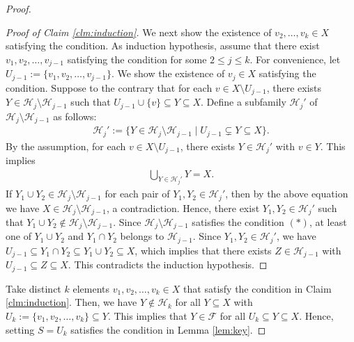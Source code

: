 \documentclass[10pt,a4paper]{amsart}
\begin{document}
\begin{proof}
\begin{proof}[Proof of Claim \ref{clm:induction}]
We next show the existence of $v_2,\ldots,v_k\in X$ satisfying the condition.
As induction hypothesis, assume that there exist $v_1,v_2,\ldots,v_{j-1}$ satisfying the condition for some $2\le j\le k$.
For convenience, let $U_{j-1}:=\{v_1,v_2,\ldots,v_{j-1}\}$.
We show the existence of $v_j\in X$ satisfying the condition.
Suppose to the contrary that for each $v\in X\setminus U_{j-1}$, there exists $Y\in \mathcal{H}_j\setminus \mathcal{H}_{j-1}$ such that $U_{j-1}\cup \{v\}\subseteq Y\subseteq X$.
Define a subfamily $\mathcal{H}_j'$ of $\mathcal{H}_j\setminus \mathcal{H}_{j-1}$ as follows:
\begin{align*}
\mathcal{H}_j':=\{Y\in \mathcal{H}_j\setminus \mathcal{H}_{j-1}\mid U_{j-1}\subsetneq Y\subseteq X\}.
\end{align*}
By the assumption, for each $v\in X\setminus U_{j-1}$, there exists $Y\in \mathcal{H}_j'$ with $v\in Y$.
This implies
\begin{align*}
\bigcup_{Y\in \mathcal{H}_j'}Y=X.
\end{align*}
If $Y_1\cup Y_2\in \mathcal{H}_j\setminus \mathcal{H}_{j-1}$ for each pair of $Y_1,Y_2\in \mathcal{H}_j'$, then by the above equation we have $X\in \mathcal{H}_j\setminus \mathcal{H}_{j-1}$, a contradiction.
Hence, there exist $Y_1,Y_2\in \mathcal{H}_j'$ such that $Y_1\cup Y_2\notin \mathcal{H}_j\setminus \mathcal{H}_{j-1}$.
Since $\mathcal{H}_j\setminus \mathcal{H}_{j-1}$ satisfies the condition $(*)$, at least one of $Y_1\cup Y_2$ and $Y_1\cap Y_2$ belongs to $\mathcal{H}_{j-1}$.
Since $Y_1,Y_2\in \mathcal{H}_j'$, we have $U_{j-1}\subseteq Y_1\cap Y_2\subseteq Y_1\cup Y_2\subseteq X$, which implies that there exists $Z\in \mathcal{H}_{j-1}$ with $U_{j-1}\subseteq Z\subseteq X$.
This contradicts the induction hypothesis.
\end{proof}

Take distinct $k$ elements $v_1,v_2,\ldots,v_k\in X$ that satisfy the condition in Claim \ref{clm:induction}.
Then, we have $Y\notin \mathcal{H}_k$ for all $Y\subseteq X$ with $U_k:=\{v_1,v_2,\ldots,v_k\}\subseteq Y$.
This implies that $Y\in \mathcal{F}$ for all $U_k\subseteq Y\subseteq X$.
Hence, setting $S=U_k$ satisfies the condition in Lemma \ref{lem:key}.
\end{proof}
\end{document}
